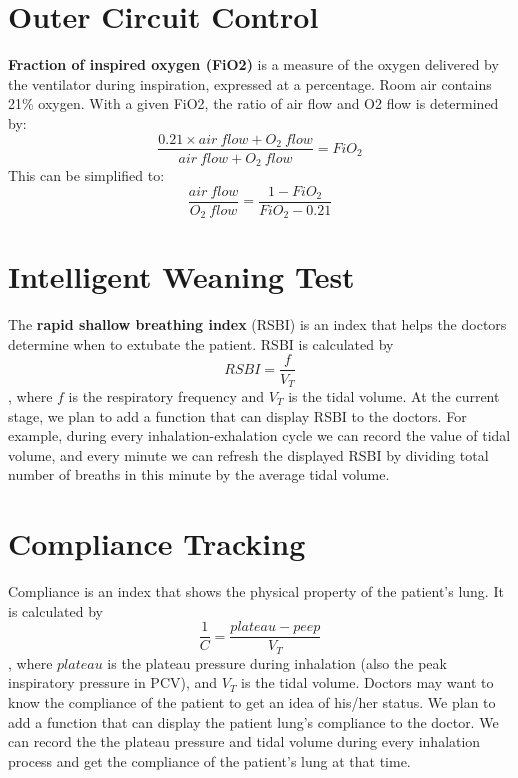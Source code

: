 \documentclass{article}
\begin{document}
\section{Outer Circuit Control}
\textbf{Fraction of inspired oxygen (FiO2)} is a measure of the oxygen delivered by the ventilator during inspiration, expressed at a percentage. Room air contains 21\% oxygen. With a given FiO2, the ratio of air flow and O2 flow is determined by:
$$\frac{0.21\times air~flow+O_2~flow}{air~flow+O_2~flow}=FiO_2$$
This can be simplified to:
$$\frac{air~flow}{O_2~flow}=\frac{1-FiO_2}{FiO_2-0.21}$$

\section{Intelligent Weaning Test}
The \textbf{rapid shallow breathing index} (RSBI) is an index that helps the doctors determine when to extubate the patient. RSBI is calculated by
$$RSBI=\frac{f}{V_T}$$, where $f$ is the respiratory frequency and $V_T$ is the tidal volume. At the current stage, we plan to add a function that can display RSBI to the doctors. For example, during every inhalation-exhalation cycle we can record the value of tidal volume, and every minute we can refresh the displayed RSBI by dividing total number of breaths in this minute by the average tidal volume.

\section{Compliance Tracking}
Compliance is an index that shows the physical property of the patient's lung. It is calculated by
$$\frac{1}{C}=\frac{plateau-peep}{V_T}$$, where $plateau$ is the plateau pressure during inhalation (also the peak inspiratory pressure in PCV), and $V_T$ is the tidal volume. Doctors may want to know the compliance of the patient to get an idea of his/her status. We plan to add a function that can display the patient lung's compliance to the doctor. We can record the the plateau pressure and tidal volume during every inhalation process and get the compliance of the patient's lung at that time.
\end{document}
